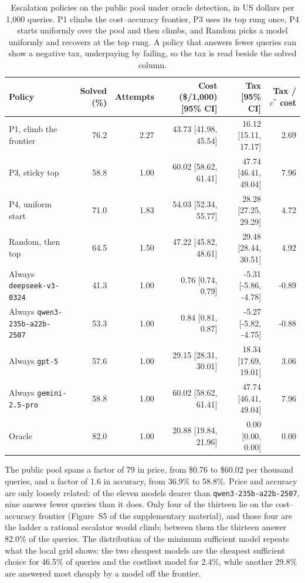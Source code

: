 \documentclass[final,5p,times,twocolumn]{elsarticle}
\theoremstyle{plain}
\begin{document}
\begin{table}[ht]
\centering
\small
\caption{Escalation policies on the public pool under oracle detection, in US
dollars per 1{,}000 queries. P1 climbs the cost--accuracy frontier, P3 uses
its top rung once, P4 starts uniformly over the pool and then climbs, and
Random picks a model uniformly and recovers at the top rung. A policy that
answers fewer queries can show a negative tax, underpaying by failing, so the
tax is read beside the solved column.}
\label{tab:public}
\setlength{\tabcolsep}{4pt}
\begin{tabular}{@{}lrrrrr@{}}
\toprule
Policy & Solved (\%) & Attempts & Cost (\$/1{,}000) [95\% CI] & Tax [95\% CI] & Tax / $c^*$ cost \\
\midrule
P1, climb the frontier & 76.2 & 2.27 & 43.73 [41.98, 45.54] & 16.12 [15.11, 17.17] & 2.69 \\
P3, sticky top & 58.8 & 1.00 & 60.02 [58.62, 61.41] & 47.74 [46.41, 49.04] & 7.96 \\
P4, uniform start & 71.0 & 1.83 & 54.03 [52.34, 55.77] & 28.28 [27.25, 29.29] & 4.72 \\
Random, then top & 64.5 & 1.50 & 47.22 [45.82, 48.61] & 29.48 [28.44, 30.51] & 4.92 \\
\midrule
Always \texttt{deepseek-v3-0324} & 41.3 & 1.00 & 0.76 [0.74, 0.79] & -5.31 [-5.86, -4.78] & -0.89 \\
Always \texttt{qwen3-235b-a22b-2507} & 53.3 & 1.00 & 0.84 [0.81, 0.87] & -5.27 [-5.82, -4.75] & -0.88 \\
Always \texttt{gpt-5} & 57.6 & 1.00 & 29.15 [28.31, 30.01] & 18.34 [17.69, 19.01] & 3.06 \\
Always \texttt{gemini-2.5-pro} & 58.8 & 1.00 & 60.02 [58.62, 61.41] & 47.74 [46.41, 49.04] & 7.96 \\
\midrule
Oracle & 82.0 & 1.00 & 20.88 [19.84, 21.96] & 0.00 [0.00, 0.00] & 0.00 \\
\bottomrule
\end{tabular}

\end{table}

The public pool spans a factor of 79 in price, from \$0.76 to \$60.02 per
thousand queries, and a factor of 1.6 in accuracy, from 36.9\% to 58.8\%.
Price and accuracy are only loosely related: of the eleven models dearer than
\texttt{qwen3-235b-a22b-2507}, nine answer fewer queries than it does. Only
four of the thirteen lie on the cost--accuracy frontier (Figure~S5 of the
supplementary material), and those four are the ladder a rational escalator
would climb; between them the thirteen answer 82.0\% of the queries. The
distribution of the minimum sufficient model repeats what the local grid
shows: the two cheapest models are the cheapest sufficient choice for 46.5\%
of queries and the costliest model for 2.4\%, while another 29.8\% are
answered most cheaply by a model off the frontier.
\end{document}

